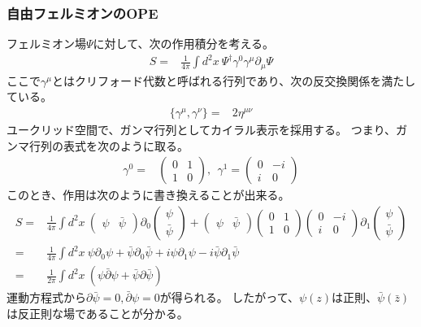 \documentclass[11pt, dvipdfmx]{article}
\numberwithin{equation}{section}
\newcommand{\blankline}{\par\vspace{\baselineskip}} %
\begin{document}
\subsubsection{自由フェルミオンのOPE}
フェルミオン場$\Psi$に対して、次の作用積分を考える。
\begin{align}
    S=&\frac{1}{4\pi}\int d^2x \ \Psi^\dagger \gamma^0 \gamma^{\mu} \partial_{\mu} \Psi
\end{align}
ここで$\gamma^\mu$とはクリフォード代数と呼ばれる行列であり、次の反交換関係を満たしている。
\begin{align}
    \{\gamma^\mu , \gamma^\nu\}=& 2 \eta^{\mu\nu}
\end{align}
ユークリッド空間で、ガンマ行列としてカイラル表示を採用する。
つまり、ガンマ行列の表式を次のように取る。
\begin{align}
    \gamma^0=& \begin{pmatrix}
      0 & 1 \\
      1 & 0
    \end{pmatrix},\ \
    \gamma^1= \begin{pmatrix}
      0 & -i \\
      i & 0
    \end{pmatrix}
\end{align}
このとき、作用は次のように書き換えることが出来る。
\begin{align}
    S=&\frac{1}{4\pi}\int d^2x \ \begin{pmatrix}
        \psi &\bar{\psi}
    \end{pmatrix}\partial_0\begin{pmatrix}
        \psi \\
        \bar{\psi}
    \end{pmatrix}+\begin{pmatrix}
        \psi &\bar{\psi}
    \end{pmatrix}\begin{pmatrix}
      0 & 1 \\
      1 & 0
    \end{pmatrix} \begin{pmatrix}
      0 & -i \\
      i & 0
    \end{pmatrix}
\partial_1\begin{pmatrix}
        \psi \\
        \bar{\psi}
    \end{pmatrix}
    \\
    =&\frac{1}{4\pi}\int d^2x \ \psi\partial_0 \psi + \bar{\psi}\partial_0 \bar{\psi} + i\psi \partial_1 \psi - i\bar{\psi}\partial_1 \bar{\psi}\\
    =&\frac{1}{2\pi}\int d^2x \ (\psi\bar{\partial} \psi + \bar{\psi}\partial\bar{\psi})
\end{align}
運動方程式から$\partial \bar{\psi}=0,\bar{\partial}\psi=0$が得られる。
したがって、$\psi(z)$は正則、$\bar{\psi}(\bar{z})$は反正則な場であることが分かる。
\blankline
\end{document}
